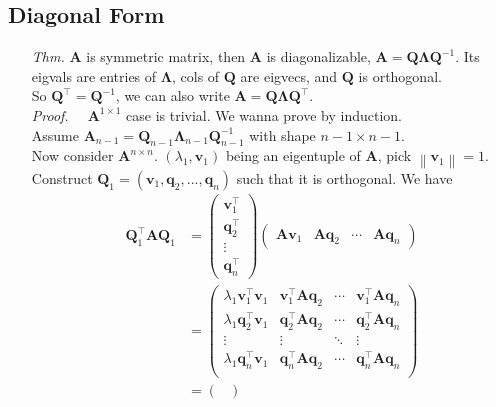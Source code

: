 \documentclass[a4paper, 11pt]{article}
\begin{document}
\subsection{Diagonal Form}
\begin{itemize}
	\item[\textit{Thm.}] $\bm{A}$ is symmetric matrix, then $\bm{A}$ is diagonalizable, $\bm{A} = \bm{Q} \bm{\Lambda} \bm{Q}^{-1} $. Its eigvals are entries of $\bm{\Lambda}$, cols of $\bm{Q}$ are eigvecs, and $\bm{Q}$ is orthogonal.\\
	So $\bm{Q}^{\top} = \bm{Q}^{-1}$, we can also write $\bm{A}=\bm{Q} \bm{\Lambda} \bm{Q}^{\top} $.\\
	\textit{Proof.~~} $\bm{A}^{1\times 1}$ case is trivial. We wanna prove by induction. \\
	Assume $\bm{A}_{n-1} = \bm{Q}_{n-1} \bm{\Lambda}_{n-1} \bm{Q}_{n-1}^{-1}$ with shape $n-1\times n-1$. \\
	Now consider $\bm{A}^{n\times n}$. $(\lambda_1, \bm{v}_1)$ being an eigentuple of $\bm{A}$, pick $\left\|\bm{v}_1\right\|=1$. Construct $\bm{Q}_1=(\bm{v}_1, \bm{q}_2, ... ,\bm{q}_n)$ such that it is orthogonal. We have
	\begin{equation*}
		\begin{split}
			\bm{Q}_1^{\top} \bm{A} \bm{Q}_1 &= 
			\begin{pmatrix}
				\bm{v}_1^{\top} \\
				\bm{q}_2^{\top} \\
				\vdots \\
				\bm{q}_n^{\top}
			\end{pmatrix}
			\begin{pmatrix}
				\bm{Av}_1 & \bm{Aq}_2 & \cdots & \bm{Aq}_n
			\end{pmatrix}\\
			&=
			\begin{pmatrix}
				\lambda_1 \bm{v}_1^{\top} \bm{v}_1 & \bm{v}_1^{\top} \bm{Aq}_2 & \cdots & \bm{v}_1^{\top} \bm{Aq}_n \\
				\lambda_1 \bm{q}_2^{\top} \bm{v}_1 & \bm{q}_2^{\top} \bm{Aq}_2 & \cdots & \bm{q}_2^{\top} \bm{Aq}_n \\
				\vdots & \vdots & \ddots & \vdots \\
				\lambda_1 \bm{q}_n^{\top} \bm{v}_1 & \bm{q}_n^{\top} \bm{Aq}_2 & \cdots & \bm{q}_n^{\top} \bm{Aq}_n\\
			\end{pmatrix}\\
			&=\begin{pmatrix}

\end{pmatrix}
\end{split}
\end{equation*}
\end{itemize}
\end{document}
